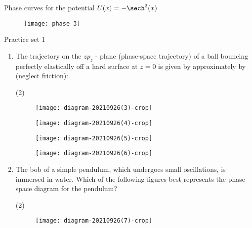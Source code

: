 \begin{example}
	Phase curves for the potential $U(x)=-\sech^2(x)$
\end{example}
\begin{answer}
\begin{figure}[H]
	\centering
	\texttt{[image: phase 3]}
\end{figure}	
\end{answer}











\newpage
\begin{abox}
	Practice set 1 
	\end{abox}
\begin{enumerate}
	\item The trajectory on the $z p_{z}$ - plane (phase-space trajectory) of a ball bouncing perfectly elastically off a hard surface at $z=0$ is given by approximately by (neglect friction):
	{}
\begin{tasks}(2)
	\task[\textbf{A.}]\begin{figure}[H]
		\centering
		\texttt{[image: diagram-20210926(3)-crop]}
	\end{figure}
	\task[\textbf{B.}]\begin{figure}[H]
		\centering
		\texttt{[image: diagram-20210926(4)-crop]}
	\end{figure}
	\task[\textbf{C.}]\begin{figure}[H]
		\centering
		\texttt{[image: diagram-20210926(5)-crop]}
	\end{figure}
	\task[\textbf{D.}]\begin{figure}[H]
		\centering
		\texttt{[image: diagram-20210926(6)-crop]}
	\end{figure}
\end{tasks}
	\item The bob of a simple pendulum, which undergoes small oscillations, is immersed in water. Which of the following figures best represents the phase space diagram for the pendulum?
	{}
\begin{tasks}(2)
	\task[\textbf{A.}]\begin{figure}[H]
		\centering
		\texttt{[image: diagram-20210926(7)-crop]}
	\end{figure}

\end{tasks}
\end{enumerate}
